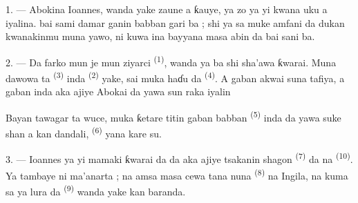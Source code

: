 %
%

\VUsaut{4.0mm}
\VUsaut{3.0mm}

\VUsaut{3.0mm}

1. --- Abokina Ioannes, wanda yake zaune a ƙauye, ya zo ya yi kwana
uku a iyalina.  bai sami damar ganin babban
gari ba ; shi ya sa muke amfani da dukan kwanakinmu muna yawo, ni kuwa
ina bayyana masa abin da bai sani ba.

2. --- Da farko mun je mun ziyarci 
\textsuperscript{(1)}, wanda ya ba shi sha’awa ƙwarai. Muna dawowa ta
 \textsuperscript{(3)} inda 
\textsuperscript{(2)} yake, sai muka haɗu da 
\textsuperscript{(4)}. A gaban  akwai
 suna tafiya, a gaban  inda aka
ajiye  Abokai da yawa sun raka iyalin 

Bayan tawagar ta wuce, muka ƙetare titin gaban babban  \textsuperscript{(5)} inda  da yawa suke shan
 a kan dandali, 
\textsuperscript{(6)} yana kare su.

3. --- Ioannes ya yi mamaki ƙwarai da  da aka ajiye
tsakanin shagon  \textsuperscript{(7)} da na
 \textsuperscript{(10)}. Ya tambaye ni
ma’anarta ; na amsa masa cewa tana nuna 
\textsuperscript{(8)} na Ingila, na kuma sa ya lura da 
\textsuperscript{(9)} wanda yake kan baranda.

